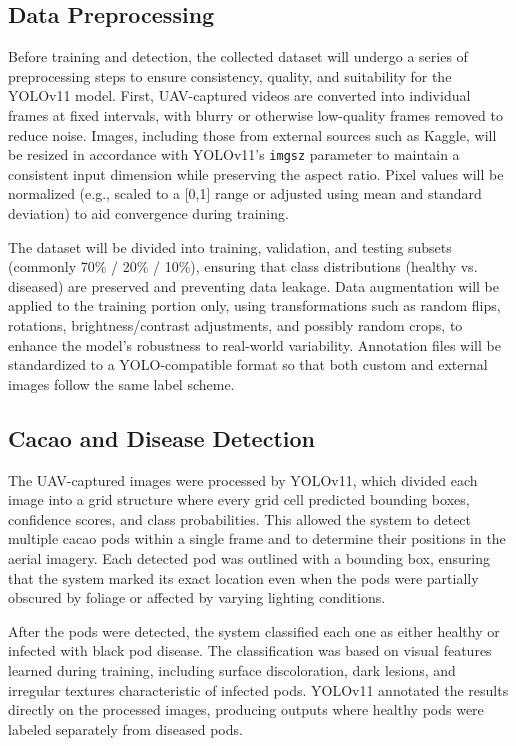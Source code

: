 \subsection{Data Preprocessing}

Before training and detection, the collected dataset will undergo a series of preprocessing steps to ensure consistency, quality, and suitability for the YOLOv11 model. First, UAV-captured videos are converted into individual frames at fixed intervals, with blurry or otherwise low-quality frames removed to reduce noise. Images, including those from external sources such as Kaggle, will be resized in accordance with YOLOv11's \texttt{imgsz} parameter to maintain a consistent input dimension while preserving the aspect ratio. Pixel values will be normalized (e.g., scaled to a [0,1] range or adjusted using mean and standard deviation) to aid convergence during training.

The dataset will be divided into training, validation, and testing subsets (commonly 70\% / 20\% / 10\%), ensuring that class distributions (healthy vs. diseased) are preserved and preventing data leakage. Data augmentation will be applied to the training portion only, using transformations such as random flips, rotations, brightness/contrast adjustments, and possibly random crops, to enhance the model’s robustness to real-world variability. Annotation files will be standardized to a YOLO-compatible format so that both custom and external images follow the same label scheme.

\subsection{Cacao and Disease Detection}

The UAV-captured images were processed by YOLOv11, which divided each image into a grid structure where every grid cell predicted bounding boxes, confidence scores, and class probabilities. This allowed the system to detect multiple cacao pods within a single frame and to determine their positions in the aerial imagery. Each detected pod was outlined with a bounding box, ensuring that the system marked its exact location even when the pods were partially obscured by foliage or affected by varying lighting conditions.

After the pods were detected, the system classified each one as either healthy or infected with black pod disease. The classification was based on visual features learned during training, including surface discoloration, dark lesions, and irregular textures characteristic of infected pods. YOLOv11 annotated the results directly on the processed images, producing outputs where healthy pods were labeled separately from diseased pods.

